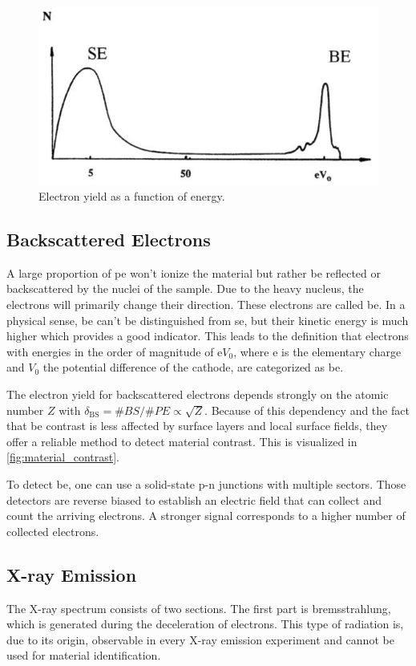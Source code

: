 \begin{figure}
	\centering
	\includegraphics[width=0.95\linewidth]{../assets/elektronen.png}
	\caption{Electron yield as a function of energy. }
	\label{fig:electrons}
\end{figure}

\subsection{Backscattered Electrons}
A large proportion of \ac{pe} won't ionize the material but
rather be reflected or backscattered by the nuclei of the sample.
Due to the heavy nucleus, the electrons will primarily change their
direction.
These electrons are called \ac{be}. In a physical sense, \ac{be} can't be
distinguished from \ac{se}, but their kinetic energy is much higher
which provides a good indicator.
This leads to the definition that electrons with energies in the order
of magnitude of $\mathrm{e} V_0$, where $\mathrm{e}$ is the elementary
charge and $V_0$ the potential difference of the cathode, are
categorized as \ac{be}.

The electron yield for backscattered electrons depends strongly on
the atomic number $Z$ with $\delta_\text{BS} = \# BS / \# PE
	\propto \sqrt{Z}$.
Because of this dependency and the fact that \ac{be}
contrast is less affected by surface layers and local surface fields,
they offer a reliable
method to detect material contrast.
This is visualized in \cref{fig:material_contrast}.

To detect \ac{be}, one can use a solid-state p-n
junctions with multiple sectors.
Those detectors are reverse biased to establish an electric field that
can collect and count the arriving electrons.
A stronger signal corresponds to a higher number of collected electrons.

\subsection{X-ray Emission}
The X-ray spectrum consists of two sections.
The first part is bremsstrahlung, which is generated during the
deceleration of electrons.
This type of radiation is, due to its origin, observable in every X-ray
emission experiment and cannot be used for material identification.

